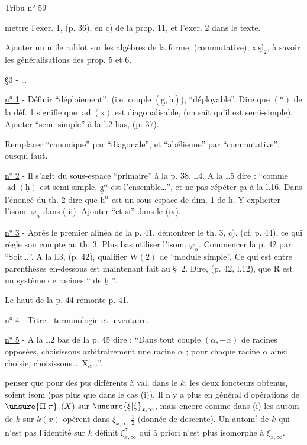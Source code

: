 Tribu n° 59

mettre l'exer. 1, (p. 36), en c) de la prop. 11, et l'exer. 2 dans le texte.

Ajouter un utile rablot sur les algèbres de la forme, (commutative), $\mathrm{x}\ \underline{\mathrm{sl}}_2$, à savoir les généralisations des prop. 5 et 6.

\S3 - \ldots

\uline{n° 1} - Définir ``déploiement'', (i.e. couple $(\underline{\mathrm{g}},\underline{\mathrm{h}})$), ``déployable''. Dire que $(*)$ de la déf. 1 signifie que $\operatorname{ad}(\mathrm{x})$ est diagonalisable, (on sait qu'il est semi-simple). Ajouter ``semi-simple'' à la l.2 bas, (p. 37).

Remplacer ``canonique'' par ``diagonale'', et ``abélienne'' par ``commutative'', ousqui faut.

\uline{n° 2} - Il s'agit du sous-espace ``primaire'' à la p. 38, l.4. A la l.5 dire : ``comme $\operatorname{ad}(\underline{\mathrm{h}})$ est semi-simple, $\underline{\mathrm{g}}^\alpha$ est l'ensemble\ldots'', et ne pas répéter ça à la l.16. Dans l'énoncé du th. 2 dire que $\underline{\mathrm{h}}^\alpha$ est un sous-espace de dim. 1 de $\underline{\mathrm{h}}$. Y expliciter l'isom. $\varphi_\alpha$ dans (iii). Ajouter ``et si'' dans le (iv).

\uline{n° 3} - Après le premier alinéa de la p. 41, démontrer le th. 3, c), (cf. p. 44), ce qui règle son compte au th. 3. Plus bas utiliser l'isom. $\varphi_\alpha$. Commencer la p. 42 par ``Soit\ldots''. A la l.3, (p. 42), qualifier $\mathrm{W}(2)$ de ``module simple''. Ce qui est entre parenthèses en-dessous est maintenant fait au \S\ 2. Dire, (p. 42, l.12), que $\mathrm{R}$ est un système de racines `` de $\underline{\mathrm{h}}$ ''.

Le haut de la p. 44 remonte p. 41.

\uline{n° 4} - Titre : terminologie et inventaire.

\uline{n° 5} - A la l.2 bas de la p. 45 dire : ``Dans tout couple $(\alpha,-\alpha)$ de racines opposées, choisissons arbitrairement une racine $\alpha$ ; pour chaque racine $\alpha$ ainsi choisie, choisissons\ldots\ $\mathrm{X}_\alpha$\ldots''.

penser que pour des pts différents à val. dans le  $k$, les deux foncteurs obtenus, soient isom (pas plus que dans le cas (i)). Il n’y a plus en général d’opérations de $\unsure{\Pi|\pi}_1(X)$ sur $\unsure{\xi|\zeta}_{x,\infty}$, mais encore comme dans (i) les autom de $k$ sur $k(x)$ opèrent dans $\xi_{x,\infty}$ $\tfrac12$ \uline{} (donnée de descente). Un autom$^{t}$ de $k$ qui n’est pas l’identité sur $k$ définit $\xi_{x,\infty}^{\sigma}$ qui à priori n’est plus isomorphe à $\xi_{x,\infty}$.

